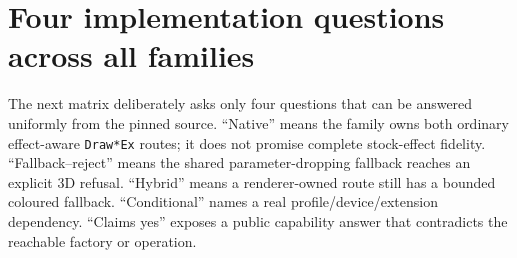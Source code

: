 \section{Four implementation questions across all \RendererFamilyCount{} families}

The next matrix deliberately asks only four questions that can be answered uniformly from the
pinned source.  ``Native'' means the family owns both ordinary effect-aware \texttt{Draw*Ex}
routes; it does not promise complete stock-effect fidelity.  ``Fallback--reject'' means the
shared parameter-dropping fallback reaches an explicit 3D refusal.  ``Hybrid'' means a
renderer-owned route still has a bounded coloured fallback.  ``Conditional'' names a real
profile/device/extension dependency.  ``Claims yes'' exposes a public capability answer that
contradicts the reachable factory or operation.

